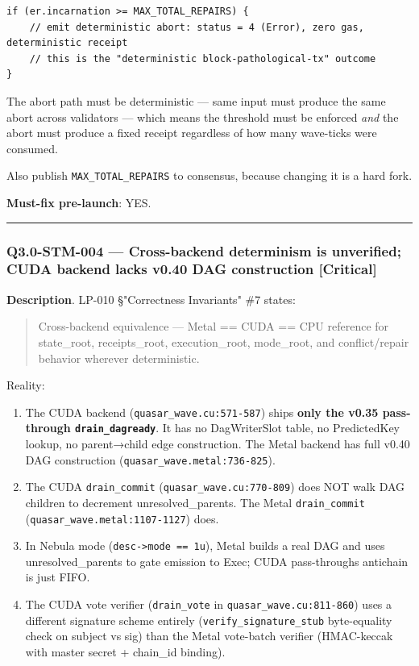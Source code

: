 \documentclass[
]{article}
\providecommand{\tightlist}{%
  \setlength{\itemsep}{0pt}\setlength{\parskip}{0pt}}
\begin{document}
\begin{verbatim}
if (er.incarnation >= MAX_TOTAL_REPAIRS) {
    // emit deterministic abort: status = 4 (Error), zero gas, deterministic receipt
    // this is the "deterministic block-pathological-tx" outcome
}
\end{verbatim}

The abort path must be deterministic --- same input must produce the
same abort across validators --- which means the threshold must be
enforced \emph{and} the abort must produce a fixed receipt regardless of
how many wave-ticks were consumed.

Also publish \texttt{MAX\_TOTAL\_REPAIRS} to consensus, because changing
it is a hard fork.

\textbf{Must-fix pre-launch}: YES.

\begin{center}\rule{0.5\linewidth}{0.5pt}\end{center}

\subsubsection{Q3.0-STM-004 --- Cross-backend determinism is unverified;
CUDA backend lacks v0.40 DAG construction
{[}Critical{]}}\label{q30-stm-004--cross-backend-determinism-is-unverified-cuda-backend-lacks-v040-dag-construction-critical}

\textbf{Description}. LP-010 §"Correctness Invariants" \#7 states:

\begin{quote}
Cross-backend equivalence --- Metal == CUDA == CPU reference for
state\_root, receipts\_root, execution\_root, mode\_root, and
conflict/repair behavior wherever deterministic.
\end{quote}

Reality:

\begin{enumerate}
\def\labelenumi{\arabic{enumi}.}
\tightlist
\item
  The CUDA backend (\texttt{quasar\_wave.cu:571-587}) ships \textbf{only
  the v0.35 pass-through \texttt{drain\_dagready}}. It has no
  DagWriterSlot table, no PredictedKey lookup, no parent→child edge
  construction. The Metal backend has full v0.40 DAG construction
  (\texttt{quasar\_wave.metal:736-825}).
\item
  The CUDA \texttt{drain\_commit} (\texttt{quasar\_wave.cu:770-809})
  does NOT walk DAG children to decrement unresolved\_parents. The Metal
  \texttt{drain\_commit} (\texttt{quasar\_wave.metal:1107-1127}) does.
\item
  In Nebula mode (\texttt{desc-\textgreater{}mode\ ==\ 1u}), Metal
  builds a real DAG and uses unresolved\_parents to gate emission to
  Exec; CUDA pass-through\textquotesingle s antichain is just FIFO.
\item
  The CUDA vote verifier (\texttt{drain\_vote} in
  \texttt{quasar\_wave.cu:811-860}) uses a different signature scheme
  entirely (\texttt{verify\_signature\_stub} byte-equality check on
  subject vs sig) than the Metal vote-batch verifier (HMAC-keccak with
  master secret + chain\_id binding).
\end{enumerate}
\end{document}
